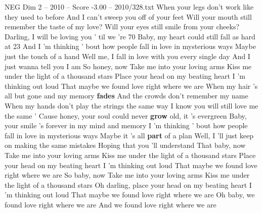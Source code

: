 \begin{textsample}{NEG Dim 2 – 2010 – Score -3.00 – 2010/328.txt}  \label{ex:f2_neg_005}
When your legs don't work like they used to before And I can't sweep you off of your feet Will your mouth still remember the taste of my love?
Will your eyes still smile from your cheeks?
Darling, I will be loving you ' til we 're 70 Baby, my heart could still fall as hard at 23 And I 'm thinking ' bout how people fall in love in mysterious ways Maybe just the touch of a hand Well me, I fall in love with you every single day And I just wanna tell you I am So honey, now Take me into your loving arms Kiss me under the light of a thousand stars Place your head on my beating heart I 'm thinking out loud That maybe we found love right where we are When my hair 's all but gone and my memory \textbf{fades} And the crowds don't remember my name When my hands don't play the strings the same way I know you will still love me the same ' Cause honey, your soul could never \textbf{grow} old, it 's evergreen Baby, your smile 's forever in my mind and memory I 'm thinking ' bout how people fall in love in mysterious ways Maybe it 's all \textbf{part} of a plan Well, I 'll just keep on making the same mistakes Hoping that you 'll understand That baby, now Take me into your loving arms Kiss me under the light of a thousand stars Place your head on my beating heart I 'm thinking out loud That maybe we found love right where we are So baby, now Take me into your loving arms Kiss me under the light of a thousand stars Oh darling, place your head on my beating heart I 'm thinking out loud That maybe we found love right where we are Oh baby, we found love right where we are And we found love right where we are

\end{textsample}

